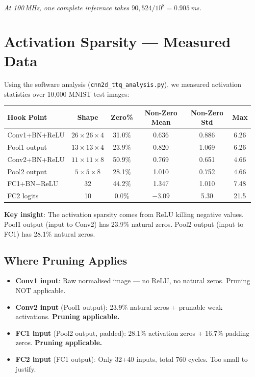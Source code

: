 \documentclass[11pt,a4paper]{article}
\begin{document}
\vspace{6pt}
\noindent\textit{At 100\,MHz, one complete inference takes $90{,}524 / 10^8 = 0.905$\,ms.}

\section{Activation Sparsity — Measured Data}
\label{sec:sparsity}

Using the software analysis (\texttt{cnn2d\_ttq\_analysis.py}), we
measured activation statistics over 10,000 MNIST test images:

\begin{center}
\begin{tabular}{lccccc}
\toprule
\textbf{Hook Point} & \textbf{Shape} & \textbf{Zero\%} & \textbf{Non-Zero Mean} & \textbf{Non-Zero Std} & \textbf{Max} \\
\midrule
Conv1+BN+ReLU & $26\times26\times4$ & 31.0\% & 0.636 & 0.886 & 6.26 \\
Pool1 output  & $13\times13\times4$ & 23.9\% & 0.820 & 1.069 & 6.26 \\
Conv2+BN+ReLU & $11\times11\times8$ & 50.9\% & 0.769 & 0.651 & 4.66 \\
Pool2 output  & $5\times5\times8$   & 28.1\% & 1.010 & 0.752 & 4.66 \\
FC1+BN+ReLU   & 32                  & 44.2\% & 1.347 & 1.010 & 7.48 \\
FC2 logits    & 10                  & 0.0\%  & $-3.09$ & 5.30 & 21.5 \\
\bottomrule
\end{tabular}
\end{center}

\noindent\textbf{Key insight}: The activation sparsity comes from ReLU killing
negative values.  Pool1 output (input to Conv2) has 23.9\% natural zeros.
Pool2 output (input to FC1) has 28.1\% natural zeros.

\subsection{Where Pruning Applies}

\begin{itemize}[nosep]
    \item \textbf{Conv1 input}: Raw normalised image — no ReLU, no natural zeros.
        \textcolor{skipred}{Pruning NOT applicable.}
    \item \textbf{Conv2 input} (Pool1 output): 23.9\% natural zeros + prunable weak activations.
        \textcolor{activegreen}{\textbf{Pruning applicable.}}
    \item \textbf{FC1 input} (Pool2 output, padded): 28.1\% activation zeros + 16.7\% padding zeros.
        \textcolor{activegreen}{\textbf{Pruning applicable.}}
    \item \textbf{FC2 input} (FC1 output): Only 32+40 inputs, total 760 cycles.
        \textcolor{skipred}{Too small to justify.}
\end{itemize}
\end{document}
